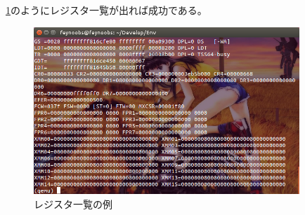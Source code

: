 \documentclass[a4j]{jarticle}
\begin{document}
\begin{multicols}{2}
\ref{fig:QEMU_REG_INFO}のようにレジスタ一覧が出れば成功である。
\begin{figure}[htbp]
	\begin{center}
    	\includegraphics[width=10cm]{./IMG/QEMU_INFO_REGISTERS.png}
	\end{center}
    \caption{レジスタ一覧の例}
    \label{fig:QEMU_REG_INFO}
\end{figure}

\newpage
\end{multicols}
\end{document}
